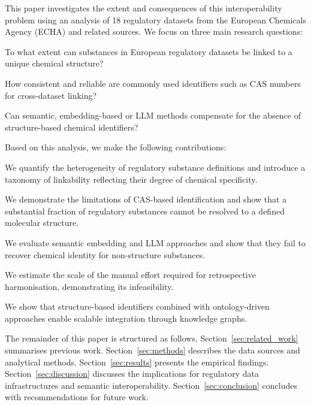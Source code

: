 This paper investigates the extent and consequences of this interoperability problem using an analysis of 18 regulatory datasets from the European Chemicals Agency (ECHA) and related sources. We focus on three main research questions:

\begin{rqlist}

	\item To what extent can substances in European regulatory datasets be linked to a unique chemical structure?
	\label{sec:question1}
	\item How consistent and reliable are commonly used identifiers such as CAS numbers for cross-dataset linking?
	\label{sec:question2}
	\item {} Can semantic, embedding-based or LLM methods compensate for the absence of structure-based chemical identifiers?
	\label{sec:question3}
\end{rqlist}

Based on this analysis, we make the following contributions:
\begin{clist}
	\item We quantify the heterogeneity of regulatory substance definitions and introduce a taxonomy of linkability reflecting their degree of chemical specificity.
	\label{sec:contribution1}
	\item {} We demonstrate the limitations of CAS-based identification and show that a substantial fraction of regulatory substances cannot be resolved to a defined molecular structure.
	\label{sec:contribution2}
	\item We evaluate semantic embedding and LLM approaches and show that they fail to recover chemical identity for non-structure substances.
	\label{sec:contribution3}
	\item We estimate the scale of the manual effort required for retrospective harmonisation, demonstrating its infeasibility.
	\label{sec:contribution4}
	\item We show that structure-based identifiers combined with ontology-driven approaches enable scalable integration through knowledge graphs.
	\label{sec:contribution5}
\end{clist}

The remainder of this paper is structured as follows. Section~\ref{sec:related_work} summarises previous work. Section~\ref{sec:methods} describes the data sources and analytical methods. Section~\ref{sec:results} presents the empirical findings. Section~\ref{sec:discussion} discusses the implications for regulatory data infrastructures and semantic interoperability. Section~\ref{sec:conclusion} concludes with recommendations for future work.


